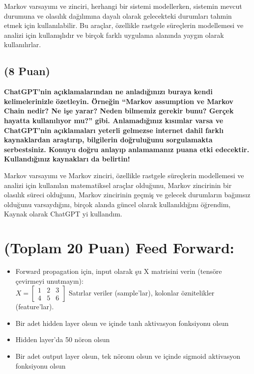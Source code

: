 \documentclass[11pt]{article}
\begin{document}
Markov varsayımı ve zinciri, herhangi bir sistemi modellerken, sistemin mevcut durumuna ve olasılık dağılımına dayalı olarak gelecekteki durumları tahmin etmek için kullanılabilir. Bu araçlar, özellikle rastgele süreçlerin modellemesi ve analizi için kullanışlıdır ve birçok farklı uygulama alanında yaygın olarak kullanılırlar.

\subsection{(8 Puan)} \textbf{ChatGPT’nin açıklamalarından ne anladığınızı buraya kendi kelimelerinizle özetleyin. Örneğin ``Markov assumption ve Markov Chain nedir? Ne işe yarar? Neden bilmemiz gerekir bunu? Gerçek hayatta kullanılıyor mu?'' gibi. Anlamadığınız kısımlar varsa ve ChatGPT’nin açıklamaları yeterli gelmezse internet dahil farklı kaynaklardan araştırıp, bilgilerin doğruluğunu sorgulamakta serbestsiniz. Konuyu doğru anlayıp anlamamanız puana etki edecektir. Kullandığınız kaynakları da belirtin!}

Markov varsayımı ve Markov zinciri, özellikle rastgele süreçlerin modellemesi ve analizi için kullanılan matematiksel araçlar olduğunu, Markov zincirinin bir olasılık süreci olduğunu, Markov zincirinin geçmiş ve gelecek durumların bağımsız olduğunu varsaydığını, birçok alanda güncel olarak kullanıldığını öğrendim, Kaynak olarak ChatGPT yi kullandım.

\section{(Toplam 20 Puan) Feed Forward:}
 
\begin{itemize}
    \item Forward propagation için, input olarak şu X matrisini verin (tensöre çevirmeyi unutmayın):\\
    $X = \begin{bmatrix}
        1 & 2 & 3\\
        4 & 5 & 6
        \end{bmatrix}$
    Satırlar veriler (sample'lar), kolonlar öznitelikler (feature'lar).
    \item Bir adet hidden layer olsun ve içinde tanh aktivasyon fonksiyonu olsun
    \item Hidden layer'da 50 nöron olsun
    \item Bir adet output layer olsun, tek nöronu olsun ve içinde sigmoid aktivasyon fonksiyonu olsun
\end{itemize}
\end{document}
